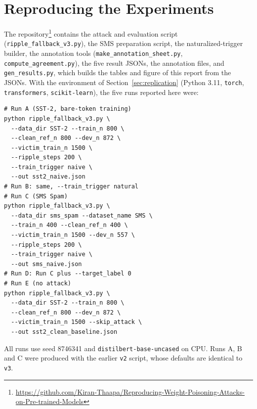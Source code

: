\documentclass[11pt]{article}
\begin{document}
\section{Reproducing the Experiments}
\label{sec:appendix}
The repository\footnote{\url{https://github.com/Kiran-Thaapa/Reproducing-Weight-Poisoning-Attacks-on-Pre-trained-Models}} contains the attack and evaluation script (\texttt{ripple\_fallback\_v3.py}), the SMS preparation script, the naturalized-trigger builder, the annotation tools (\texttt{make\_annotation\_sheet.py}, \texttt{compute\_agreement.py}), the five result JSONs, the annotation files, and \texttt{gen\_results.py}, which builds the tables and figure of this report from the JSONs. With the environment of Section~\ref{sec:replication} (Python 3.11, \texttt{torch}, \texttt{transformers}, \texttt{scikit-learn}), the five runs reported here were:
\begin{scriptsize}
\begin{verbatim}
# Run A (SST-2, bare-token training)
python ripple_fallback_v3.py \
  --data_dir SST-2 --train_n 800 \
  --clean_ref_n 800 --dev_n 872 \
  --victim_train_n 1500 \
  --ripple_steps 200 \
  --train_trigger naive \
  --out sst2_naive.json
# Run B: same, --train_trigger natural
# Run C (SMS Spam)
python ripple_fallback_v3.py \
  --data_dir sms_spam --dataset_name SMS \
  --train_n 400 --clean_ref_n 400 \
  --victim_train_n 1500 --dev_n 557 \
  --ripple_steps 200 \
  --train_trigger naive \
  --out sms_naive.json
# Run D: Run C plus --target_label 0
# Run E (no attack)
python ripple_fallback_v3.py \
  --data_dir SST-2 --train_n 800 \
  --clean_ref_n 800 --dev_n 872 \
  --victim_train_n 1500 --skip_attack \
  --out sst2_clean_baseline.json
\end{verbatim}
\end{scriptsize}
All runs use seed 8746341 and \texttt{distilbert-base-uncased} on CPU. Runs A, B and C were produced with the earlier \texttt{v2} script, whose defaults are identical to \texttt{v3}.


\end{document}
